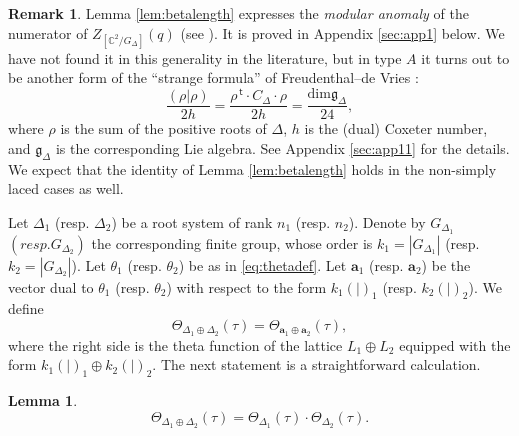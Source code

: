 \documentclass{article}
\newtheorem{lemma}[theorem]{Lemma}
\theoremstyle{definition}
\newtheorem{remark}[theorem]{Remark}
\newcommand{\CC} {{\mathbb C}}          %
\renewcommand{\top}{\,\mathsf{t}}
\begin{document}
\begin{remark}Lemma \ref{lem:betalength} expresses the \emph{modular anomaly} of the 
numerator of $Z_{[ \CC^2/G_\Delta]}(q)$ (see \cite[12.7.5]{kac1994infinite}). It is proved 
in Appendix \ref{sec:app1} below. We have not found it in this generality in the literature, 
but in type $A$ it turns out to be another form of the ``strange formula'' of 
Freudenthal--de Vries \cite{freudenthal1969linear}:
\[ \frac{(\rho|\rho)}{2h}=\frac{\rho^ {\top} \cdot C_\Delta 
\cdot \rho}{2h}=\frac{\mathrm{dim} \mathfrak{g}_{\Delta}}{24}, \]
where $\rho$ is the sum of the positive roots of $\Delta$, $h$ is the (dual) Coxeter number, 
and $\mathfrak{g}_{\Delta}$ is the corresponding Lie algebra.
See Appendix \ref{sec:app11} for the details. We expect that the identity of Lemma 
\ref{lem:betalength} holds in the non-simply laced cases as well.
\end{remark}

Let $\Delta_1$ (resp. $\Delta_2$) be a root system of rank $n_1$ (resp. $n_2$). Denote by 
$G_{\Delta_1}$ $(resp. G_{\Delta_2})$ the corresponding finite group, whose order is 
$k_1=|G_{\Delta_1}|$ (resp. $k_2=|G_{\Delta_2}|$). Let 
$\theta_1$ (resp. $\theta_2$) be as in \eqref{eq:thetadef}.
Let
$\mathbf{a}_1$ (resp.  $\mathbf{a}_2$) be the vector dual to $\theta_1$ (resp. $\theta_2$) 
with respect to the form
$k_1(|)_1$ (resp. $k_2(|)_2$). We define
\[ \Theta_{\Delta_1 \oplus \Delta_2}(\tau)=\Theta_{\mathbf{a}_1 \oplus \mathbf{a}_2}(\tau),\]
where the right side is the theta function of the lattice $L_1 \oplus L_2$ equipped with the 
form $k_1(|)_1 \oplus k_2(|)_2$. The next statement is a straightforward calculation.

\begin{lemma}
\[ \Theta_{\Delta_1 \oplus \Delta_2}(\tau)=\Theta_{\Delta_1}(\tau)
\cdot \Theta_{\Delta_2}(\tau).\]
\end{lemma}
\end{document}
